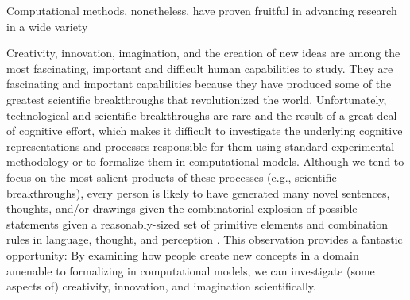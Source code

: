 \documentclass[12pt]{article}
\begin{document}
\begin{flushleft}
Computational methods, nonetheless, have proven fruitful in advancing research in a wide variety













Creativity, innovation, imagination, and the creation of new ideas are among the most fascinating, important and difficult human capabilities to study. They are fascinating and important capabilities because they have produced some of the greatest scientific breakthroughs that revolutionized the world. Unfortunately, technological and scientific breakthroughs are rare and the result of a great deal of cognitive effort, which makes it difficult to investigate the underlying cognitive representations and processes responsible for them using standard experimental methodology or to formalize them in computational models. Although we tend to focus on the most salient products of these processes (e.g., scientific breakthroughs), every person is likely to have generated many novel sentences, thoughts, and/or drawings given the combinatorial explosion of possible statements given a reasonably-sized set of primitive elements and combination rules in language, thought, and perception \citep{goldstone2003}. This observation provides a fantastic opportunity: By examining how people create new concepts in a domain amenable to formalizing in computational models, we can investigate (some aspects of) creativity, innovation, and imagination scientifically.


\end{flushleft}
\end{document}
